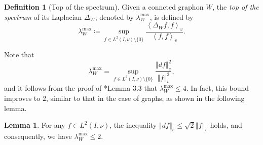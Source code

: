 \documentclass[12pt,a4paper,bold]{thesis}
\theoremstyle{definition}
\newtheorem{defn}[thm]{Definition}
\newtheorem{lemma}[thm]{Lemma}
\newcommand*{\ip}[2]{\left\langle #1 , #2 \right\rangle}
\newcommand*{\norm}[2][]{\left\Vert #2 \right\Vert_{#1}}
\begin{document}
\begin{defn}[Top of the spectrum]
    Given a conncted graphon $W$, the \emph{top of the spectrum} of its Laplacian $\Delta_W$, 
    denoted by $\lambda_W^{\max}$, is defined by
    \begin{equation*}
        \lambda_W^{\max} 
        \coloneq \sup_{f \in L^2(I,\nu) \setminus \{0\}} \frac{\ip{\Delta_W f}{f}_v}{\ip{f}{f}_v}.
    \end{equation*}
\end{defn}

Note that
\begin{equation*}
    \lambda_W^{\max} 
    = \sup_{f \in L^2(I,\nu) \setminus \{0\}} \frac{\norm[e]{df}^2}{\norm[v]{f}^2},
\end{equation*}
and it follows from the proof of \cite{Abhishek-Mahan24}*{Lemma 3.3} that 
$\lambda_W^{\max} \leq 4$. In fact, this bound improves to $2$, 
similar to that in the case of graphs, as shown in the following lemma.

\begin{lemma} \label{lemma:df-leq-2f}
    For any $f \in L^2(I, \nu)$, the inequality 
    $\norm[e]{df} \leq \sqrt{2} \norm[v]{f}$ holds, and consequently, we have
    $\lambda_W^{\max} \leq 2$.
\end{lemma}
\end{document}
